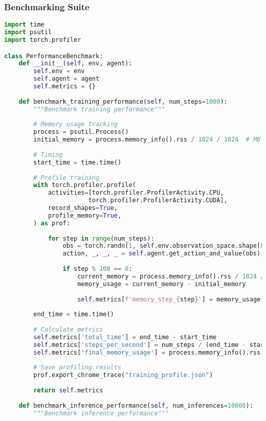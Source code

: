 \documentclass[12pt,a4paper]{article}
\begin{document}
\subsubsection{Benchmarking Suite}
\begin{lstlisting}[language=Python, caption=Performance Benchmarking]
import time
import psutil
import torch.profiler

class PerformanceBenchmark:
    def __init__(self, env, agent):
        self.env = env
        self.agent = agent
        self.metrics = {}
    
    def benchmark_training_performance(self, num_steps=1000):
        """Benchmark training performance"""
        
        # Memory usage tracking
        process = psutil.Process()
        initial_memory = process.memory_info().rss / 1024 / 1024  # MB
        
        # Timing
        start_time = time.time()
        
        # Profile training
        with torch.profiler.profile(
            activities=[torch.profiler.ProfilerActivity.CPU, 
                       torch.profiler.ProfilerActivity.CUDA],
            record_shapes=True,
            profile_memory=True,
        ) as prof:
            
            for step in range(num_steps):
                obs = torch.randn(1, self.env.observation_space.shape[0])
                action, _, _, _ = self.agent.get_action_and_value(obs)
                
                if step % 100 == 0:
                    current_memory = process.memory_info().rss / 1024 / 1024
                    memory_usage = current_memory - initial_memory
                    
                    self.metrics[f'memory_step_{step}'] = memory_usage
        
        end_time = time.time()
        
        # Calculate metrics
        self.metrics['total_time'] = end_time - start_time
        self.metrics['steps_per_second'] = num_steps / (end_time - start_time)
        self.metrics['final_memory_usage'] = process.memory_info().rss / 1024 / 1024 - initial_memory
        
        # Save profiling results
        prof.export_chrome_trace("training_profile.json")
        
        return self.metrics
    
    def benchmark_inference_performance(self, num_inferences=10000):
        """Benchmark inference performance"""
        

\end{lstlisting}
\end{document}
